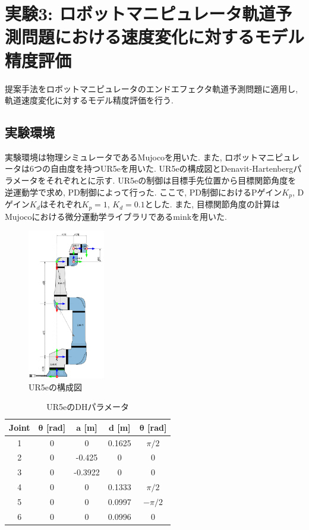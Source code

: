 \section{実験3: ロボットマニピュレータ軌道予測問題における速度変化に対するモデル精度評価}
提案手法をロボットマニピュレータのエンドエフェクタ軌道予測問題に適用し, 軌道速度変化に対するモデル精度評価を行う.

\subsection{実験環境}
実験環境は物理シミュレータであるMujoco\cite{mujoco}を用いた.
また, ロボットマニピュレータは6つの自由度を持つUR5eを用いた.
UR5eの構成図とDenavit-Hartenbergパラメータをそれぞれとに示す.
UR5eの制御は目標手先位置から目標関節角度を逆運動学で求め, PD制御によって行った.
ここで, PD制御におけるPゲイン$K_p$, Dゲイン$K_d$はそれぞれ$K_p=1$, $K_d=0.1$とした.
また, 目標関節角度の計算はMujocoにおける微分運動学ライブラリであるmink\cite{mink}を用いた.
\begin{figure}[htb]
    \centering
    \includegraphics[width=0.3\textwidth]{Static/ur5e_structure.png}
    \caption[UR5eの構成図]{
        UR5eの構成図\cite{ur5e}
    }
    \label{fig:ur5e:structure}
\end{figure}

\begin{table}[htb]
    \centering
    \caption[UR5eのDHパラメータ]{
        UR5eのDHパラメータ\cite{ur5e}
    }
    \label{tab:ur5e:dh}
    \begin{tabular}{ccccc}
        \hline
        \textbf{Joint} & $\bm{\theta}$ [rad] & $\bm{a}$ [m]& $\bm{d}$ [m]& $\bm{\theta}$ [rad]\\
        \hline
        1 & 0 & 0       & 0.1625 & $\pi/2$\\
        2 & 0 & -0.425  & 0       & 0\\
        3 & 0 & -0.3922 & 0       & 0\\
        4 & 0 & 0       & 0.1333 & $\pi/2$\\
        5 & 0 & 0       & 0.0997 & $-\pi/2$\\
        6 & 0 & 0       & 0.0996 & 0\\
        \hline
    \end{tabular}
\end{table}


